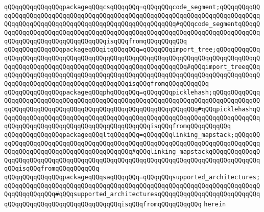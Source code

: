 \verb|qQQqqQQqqQQqqQQqpackageqQQqcsqQQqqQQq=qQQqqQQqcode_segment;qQQqqQQqqQQqqQQqqQQqqQQqqQQqqQQqqQQqqQQqqQQqqQQqqQQqqQQqqQQqqQQqqQQqqQQqqQQqqQQqqQQqqQQqqQQqqQQqqQQqqQQqqQQqqQQqqQQqqQQqqQQqqQQq#qQQqcode_segmentqQQqqQQqqQQqqQQqqQQqqQQqqQQqqQQqqQQqqQQqqQQqqQQqqQQqqQQqqQQqqQQqqQQqqQQqqQQqqQQqqQQqqQQqqQQqqQQqqQQqqQQqisqQQqfromqQQqqQQqqQQq|\newline
\verb|qQQqqQQqqQQqqQQqpackageqQQqitqQQqqQQq=qQQqqQQqimport_tree;qQQqqQQqqQQqqQQqqQQqqQQqqQQqqQQqqQQqqQQqqQQqqQQqqQQqqQQqqQQqqQQqqQQqqQQqqQQqqQQqqQQqqQQqqQQqqQQqqQQqqQQqqQQqqQQqqQQqqQQqqQQqqQQqqQQq#qQQqimport_treeqQQqqQQqqQQqqQQqqQQqqQQqqQQqqQQqqQQqqQQqqQQqqQQqqQQqqQQqqQQqqQQqqQQqqQQqqQQqqQQqqQQqqQQqqQQqqQQqqQQqqQQqqQQqisqQQqfromqQQqqQQqqQQq|\newline
\verb|qQQqqQQqqQQqqQQqpackageqQQqphqQQqqQQq=qQQqqQQqpicklehash;qQQqqQQqqQQqqQQqqQQqqQQqqQQqqQQqqQQqqQQqqQQqqQQqqQQqqQQqqQQqqQQqqQQqqQQqqQQqqQQqqQQqqQQqqQQqqQQqqQQqqQQqqQQqqQQqqQQqqQQqqQQqqQQqqQQqqQQq#qQQqpicklehashqQQqqQQqqQQqqQQqqQQqqQQqqQQqqQQqqQQqqQQqqQQqqQQqqQQqqQQqqQQqqQQqqQQqqQQqqQQqqQQqqQQqqQQqqQQqqQQqqQQqqQQqqQQqqQQqisqQQqfromqQQqqQQqqQQq|\newline
\verb|qQQqqQQqqQQqqQQqpackageqQQqltqQQqqQQq=qQQqqQQqlinking_mapstack;qQQqqQQqqQQqqQQqqQQqqQQqqQQqqQQqqQQqqQQqqQQqqQQqqQQqqQQqqQQqqQQqqQQqqQQqqQQqqQQqqQQqqQQqqQQqqQQqqQQqqQQqqQQqqQQq#qQQqlinking_mapstackqQQqqQQqqQQqqQQqqQQqqQQqqQQqqQQqqQQqqQQqqQQqqQQqqQQqqQQqqQQqqQQqqQQqqQQqqQQqqQQqqQQqqQQqisqQQqfromqQQqqQQqqQQq|\newline
\verb|qQQqqQQqqQQqqQQqpackageqQQqsaqQQqqQQq=qQQqqQQqsupported_architectures;qQQqqQQqqQQqqQQqqQQqqQQqqQQqqQQqqQQqqQQqqQQqqQQqqQQqqQQqqQQqqQQqqQQqqQQqqQQqqQQqqQQq#qQQqsupported_architecturesqQQqqQQqqQQqqQQqqQQqqQQqqQQqqQQqqQQqqQQqqQQqqQQqqQQqqQQqqQQqisqQQqfromqQQqqQQqqQQq|\newline
\verb|herein|\newline
\newline
